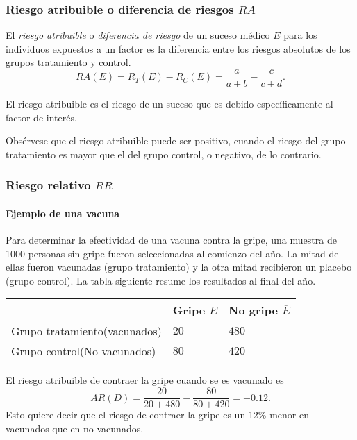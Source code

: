 \begin{frame}
\frametitle{Riesgo atribuible o diferencia de riesgos $RA$}
\begin{definicion}
El \emph{riesgo atribuible} o \emph{diferencia de riesgo} de un suceso médico $E$ para los individuos expuestos a un factor es la diferencia entre los riesgos absolutos de los grupos tratamiento y control.
\[
	RA(E)=R_T(E)-R_C(E)=\frac{a}{a+b}-\frac{c}{c+d}.
\]
\end{definicion}

El riesgo atribuible es el riesgo de un suceso que es debido específicamente al factor de interés.

Obsérvese que el riesgo atribuible puede ser positivo, cuando el riesgo del grupo tratamiento es mayor que el del grupo control, o negativo, de lo contrario.
\end{frame}


\begin{frame}
\frametitle{Riesgo relativo $RR$}
\framesubtitle{Ejemplo de una vacuna}
Para determinar la efectividad de una vacuna contra la gripe, una muestra de 1000 personas sin gripe fueron seleccionadas al comienzo del año. 
La mitad de ellas fueron vacunadas (grupo tratamiento) y la otra mitad recibieron un placebo (grupo control).
La tabla siguiente resume los resultados al final del año.

\begin{center}
	\begin{tabular}{|m{3cm}|m{1.8cm}<{\centering}|m{1.8cm}<{\centering}|}
	\cline{2-3}
	\multicolumn{1}{c|}{} & Gripe $E$ & No gripe $\overline E$\\ 
	\hline
	Grupo tratamiento\newline (vacunados) & $20$ & $480$\\ 
	\hline 
	Grupo control\newline (No vacunados) & $80$ & $420$\\ 
	\hline
\end{tabular}
\end{center}

El riesgo atribuible de contraer la gripe cuando se es vacunado es 
\[
	AR(D) = \frac{20}{20+480}-\frac{80}{80+420} = -0.12.
\]
Esto quiere decir que el riesgo de contraer la gripe es un 12\% menor en vacunados que en no vacunados.
\end{frame}

